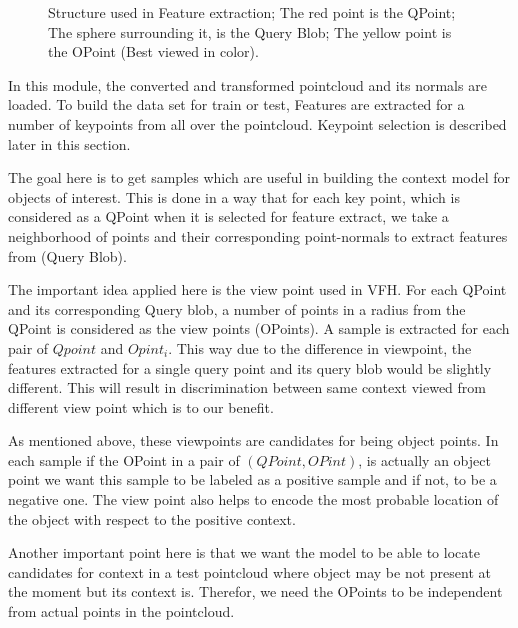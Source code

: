  \begin{figure}[t]
  \caption[Illustration of the items used in Feature Extract.]
  {Structure used in Feature extraction; The red point is the QPoint; The sphere surrounding it, is the Query Blob; The yellow
  point is the OPoint (Best viewed in color).}
  \label{FEStructure.figure}
\end{figure}
 
In this module, the converted and transformed pointcloud and its normals are loaded.
To build the data set for train or test, Features are extracted for a number of keypoints from all over 
the pointcloud.
Keypoint selection is described later in this section.

The goal here is to get samples which are useful in building the context model for objects of interest. 
This is done in a way that for each key point, which is considered as a QPoint when it is selected for feature extract, 
we take a neighborhood of points and their corresponding point-normals to extract features from (Query Blob). 

The important idea applied here is the view point used in VFH.
For each QPoint and its corresponding Query blob, a number of points in a radius from the QPoint is considered as the view points 
(OPoints).
A sample is extracted for each pair of $Qpoint$ and $Opint_i$.
This way due to the difference in viewpoint, the features extracted for a single query point and its query blob would be slightly 
different. 
This will result in discrimination between same context viewed from different view point which is to our benefit.

As mentioned above, these viewpoints are candidates for being object points.
In each sample if the OPoint in a pair of $(QPoint,OPint)$, is actually an object point we want this sample to be labeled as 
a positive sample and if not, to be a negative one. 
The view point also helps to encode the most probable location of the object with respect to the positive context. 

Another important point here is that we want the model to be able to locate candidates for context in a test pointcloud where 
object may be not present at the moment but its context is.
Therefor, we need the OPoints to be independent from actual points in the pointcloud.

